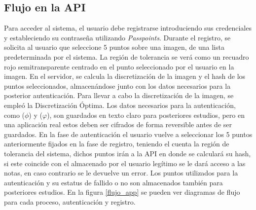 \subsection{Flujo en la API}
Para acceder al sistema, el usuario debe registrarse introduciendo sus credenciales y estableciendo su contraseña utilizando \textit{Passpoints}. Durante el registro, se solicita al usuario que seleccione 5 puntos sobre una imagen, de una lista predeterminada por el sistema. La regi\'on de tolerancia se ver\'a como un recuadro rojo semitransparente centrado en el punto seleccionado por el usuario en la imagen. En el servidor, se calcula la discretización de la imagen y el hash de los puntos seleccionados, almacenándose junto con los datos necesarios para la posterior autenticación. Para llevar a cabo la discretización de la imagen, se empleó la Discretización Óptima. Los datos necesarios para la autenticación, como  ($\phi$) y ($\varphi$), son guardados en texto claro para posteriores estudios, pero en una aplicaci\'on real estos deben ser cifrados de forma reversible antes de ser guardados. En la fase de autenticaci\'on el usuario vuelve a seleccionar los 5 puntos anteriormente fijados en la fase de registro, teniendo el cuenta la regi\'on de tolerancia del sistema, dichos puntos ir\'an a la API en donde se calcular\'a su hash, si este coincide con el almacenado por el usuario leg\'itimo se le dar\'a acceso a las notas, en caso contrario se le devuelve un error. Los puntos utilizados para la autenticaci\'on y su estatus de fallido o no son almacenados tambi\'en para posteriores estudios. En la figura \ref{flujo_app} se pueden ver diagramas de flujo para cada proceso, autenticaci\'on y registro.




\begin{figure}[H]
	
\end{figure}



